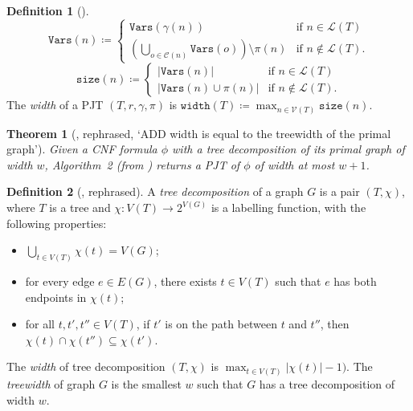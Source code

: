 \documentclass{article}
\newtheorem{theorem}{Theorem}
\theoremstyle{definition}
\newtheorem{definition}{Definition}
\theoremstyle{remark}
\begin{document}
\begin{definition}[\cite{DBLP:conf/cp/DudekPV20}]
  \[
    \mathtt{Vars}(n) \coloneqq
    \begin{cases}
      \mathtt{Vars}(\gamma(n)) & \text{if } n \in \mathcal{L}(T) \\
      \left( \bigcup_{o \in \mathcal{C}(n)} \mathtt{Vars}(o) \right) \setminus
      \pi(n) & \text{if } n \not\in \mathcal{L}(T).
    \end{cases}
  \]
  \[
    \mathtt{size}(n) \coloneqq
    \begin{cases}
      |\mathtt{Vars}(n)| & \text{if } n \in \mathcal{L}(T) \\
      |\mathtt{Vars}(n) \cup \pi(n)| & \text{if } n \not\in \mathcal{L}(T).
    \end{cases}
  \]
  The \emph{width} of a PJT $(T, r, \gamma, \pi)$ is
  $\mathtt{width}(T) \coloneqq \max_{n \in \mathcal{V}(T)} \mathtt{size}(n)$.
\end{definition}

\begin{theorem}[\cite{DBLP:conf/cp/DudekPV20}, rephrased, `ADD width is equal
  to the treewidth of the primal graph']
  Given a CNF formula $\phi$ with a tree decomposition of its primal graph of
  width $w$, Algorithm~2 (from \cite{DBLP:conf/cp/DudekPV20}) returns a
  PJT of $\phi$ of width at most $w+1$.
\end{theorem}

\begin{definition}[\cite{DBLP:journals/jct/RobertsonS84}, rephrased]
  A \emph{tree decomposition} of a graph $G$ is a pair $(T, \chi)$, where $T$ is
  a tree and $\chi\colon V(T) \to 2^{V(G)}$ is a labelling function, with the
  following properties:
  \begin{itemize}
  \item $\bigcup_{t \in V(T)} \chi(t) = V(G)$;
  \item for every edge $e \in E(G)$, there exists $t \in V(T)$ such that $e$ has
    both endpoints in $\chi(t)$;
  \item for all $t, t', t'' \in V(T)$, if $t'$ is on the path between $t$ and
    $t''$, then $\chi(t) \cap \chi(t'') \subseteq \chi(t')$.
  \end{itemize}
  The \emph{width} of tree decomposition $(T, \chi)$ is $\max_{t \in V(T)}
  |\chi(t)| - 1)$. The \emph{treewidth} of graph $G$ is the smallest $w$ such
  that $G$ has a tree decomposition of width $w$.
\end{definition}
\end{document}
